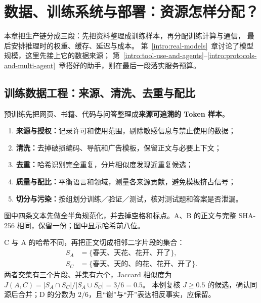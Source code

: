 \chapterrule
\section{数据、训练系统与部署：资源怎样分配？}
\label{intro:training-and-deployment}



本章把生产链分成三段：先把资料整理成训练样本，再分配训练计算与通信，
最后安排推理时的权重、缓存、延迟与成本。
第~\ref*{intro:real-models}~章讨论了模型规模，这里先接上它的数据来源；
第~\ref*{intro:tool-use-and-agents}--\ref*{intro:protocols-and-multi-agent}~章搭好的助手，则在最后一段落实服务预算。

\subsection{训练数据工程：来源、清洗、去重与配比}
\label{sec:data-engineering}
\label{concept:pretraining-data}
\label{concept:evaluation-contamination}
预训练先把网页、书籍、代码与问答整理成\textbf{来源可追溯的 Token 样本}。

\begin{enumerate}[itemsep=0pt,parsep=0pt,topsep=2pt]
\item \textbf{来源与授权：}记录许可和使用范围，剔除敏感信息与禁止使用的数据；
\item \textbf{清洗：}去掉破损编码、导航和广告模板，保留正文与必要上下文；
\item \textbf{去重：}哈希识别完全重复，分片相似度发现近重复候选；
\item \textbf{质量与配比：}平衡语言和领域，测量各来源贡献，避免模板挤占信号；
\item \textbf{切分与污染：}按组划分训练／验证／测试，核对测试题和答案是否泄漏。
\end{enumerate}

图中四条文本先做全半角规范化，并去掉空格和标点。A、B 的正文与完整 SHA-256 相同，保留一份；图中显示哈希前八位。

\par\Needspace{75mm}


C 与 A 的哈希不同，再把正文切成相邻二字片段的集合：
\[
\begin{aligned}
S_A&=\{\text{春天、天花、花开、开了}\},\\
S_C&=\{\text{春天、天的、的花、花开、开了}\}.
\end{aligned}
\]
两者交集有三个片段、并集有六个，Jaccard 相似度为
$J(A,C)=|S_A\cap S_C|/|S_A\cup S_C|=3/6=0.5$。
本例复核 $J\ge0.5$ 的候选，确认同源后合并；D 的分数为 $2/6$，且“谢”与“开”表达相反事实，应保留。

